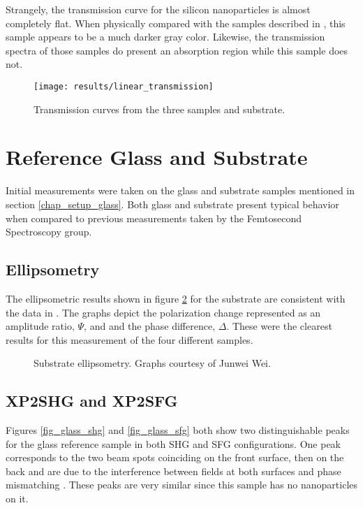 Strangely, the transmission curve for the silicon nanoparticles is almost completely flat. When physically compared with the samples described in \cite{PhysRevB.84.165316}, this sample appears to be a much darker gray color. Likewise, the transmission spectra of those samples do present an absorption region while this sample does not.

\begin{figure}[h]
\centering
\texttt{[image: results/linear\_transmission]}
\caption{Transmission curves from the three samples and substrate.\label{fig_transmission}}
\end{figure}

\section{Reference Glass and Substrate}
Initial measurements were taken on the glass and substrate samples mentioned in section \ref{chap_setup_glass}. Both glass and substrate present typical behavior when compared to previous measurements taken by the Femtosecond Spectroscopy group.

\subsection{Ellipsometry}
The ellipsometric results shown in figure \ref{fig_sub_ellip} for the substrate are consistent with the data in \cite{PhysRevB.84.165316}. The graphs depict the polarization change represented as an amplitude ratio, $\Psi$, and and the phase difference, $\Delta$. These were the clearest results for this measurement of the four different samples. 

\begin{figure}[h]
  \centering
  \caption[Substrate ellipsometry.]{Substrate ellipsometry. Graphs courtesy of Junwei Wei.}
  \label{fig_sub_ellip}
\end{figure}

\subsection{XP2SHG and XP2SFG}\label{chap_results_sub_shg}
Figures \ref{fig_glass_shg} and \ref{fig_glass_sfg} both show two distinguishable peaks for the glass reference sample in both SHG and SFG configurations. One peak corresponds to the two beam spots coinciding on the front surface, then on the back and are due to the interference between fields at both surfaces and phase mismatching \cite{sun2005nonresonant}. These peaks are very similar since this sample has no nanoparticles on it. 


